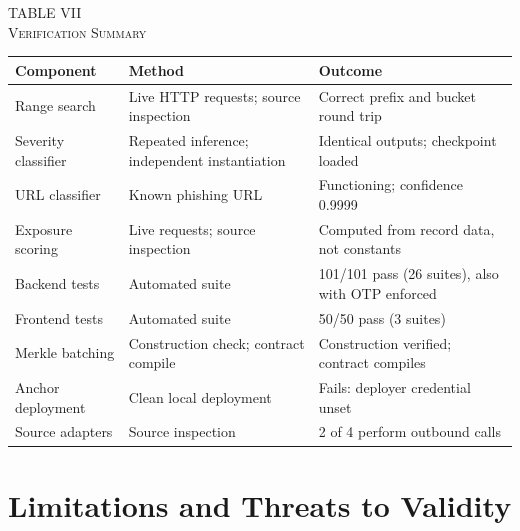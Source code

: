 \documentclass[10pt,twocolumn]{article}
\newcommand{\tcap}[2]{\begin{center}\footnotesize TABLE #1\\[1pt]\scshape #2\end{center}\vspace{-8pt}}
\begin{document}
\begin{table}[!t]
\centering
\tcap{VII}{Verification Summary}
\footnotesize
\setlength{\tabcolsep}{3pt}
\begin{tabular}{|p{}|p{}|p{}|}
\hline
\textbf{Component} & \textbf{Method} & \textbf{Outcome}\\
\hline
Range search & Live HTTP requests; source inspection & Correct prefix and bucket round trip\\
\hline
Severity classifier & Repeated inference; independent instantiation & Identical outputs; checkpoint loaded\\
\hline
URL classifier & Known phishing URL & Functioning; confidence 0.9999\\
\hline
Exposure scoring & Live requests; source inspection & Computed from record data, not constants\\
\hline
Backend tests & Automated suite & 101/101 pass (26 suites), also with OTP enforced\\
\hline
Frontend tests & Automated suite & 50/50 pass (3 suites)\\
\hline
Merkle batching & Construction check; contract compile & Construction verified; contract compiles\\
\hline
Anchor deployment & Clean local deployment & Fails: deployer credential unset\\
\hline
Source adapters & Source inspection & 2 of 4 perform outbound calls\\
\hline
\end{tabular}
\end{table}

\section{Limitations and Threats to Validity}
\end{document}
